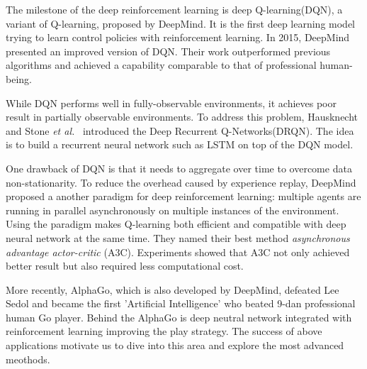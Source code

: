 
The milestone of the deep reinforcement learning is deep Q-learning(DQN)\cite{mnih2013playing}, a variant of Q-learning, proposed by DeepMind. It is the first deep learning model trying to learn control policies with reinforcement learning. In 2015, DeepMind presented an improved version of DQN\cite{mnih2015human}. Their work outperformed previous algorithms and achieved a capability comparable to that of professional human-being.

While DQN performs well in fully-observable environments, it achieves poor result in partially observable environments. To address this problem, Hausknecht and Stone \textit{et al.}~\cite{hausknecht2015deep} introduced the Deep Recurrent Q-Networks(DRQN). The idea is to build a recurrent neural network such as LSTM on top of the DQN model.

%
One drawback of DQN is that it needs to aggregate over time to overcome data non-stationarity. To reduce the overhead caused by experience replay, DeepMind \cite{mnih2016asynchronous} proposed a another paradigm for deep reinforcement learning: multiple agents are running in parallel asynchronously on multiple instances of the environment. Using the paradigm makes Q-learning both efficient and compatible with deep neural network at the same time. They named their best method \textit{asynchronous advantage actor-critic} (A3C). Experiments showed that A3C not only achieved better result but also required less computational cost.

More recently, AlphaGo\cite{brockman2016openai}, which is also developed by DeepMind, defeated Lee Sedol and became the first 'Artificial Intelligence' who beated 9-dan professional human Go player. Behind the AlphaGo is deep neutral network integrated with reinforcement learning improving the play strategy. The success of above applications motivate us to dive into this area and
explore the most advanced meothods. 


